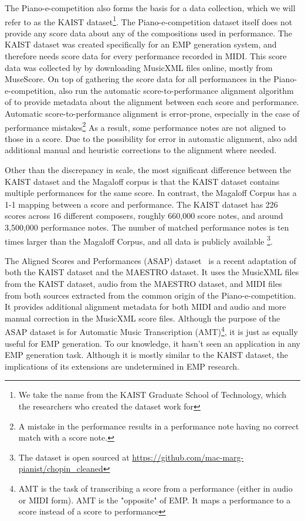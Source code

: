 The Piano-e-competition also forms the basis for a data collection, which we will refer to as the KAIST dataset\footnote{We take the name from the KAIST Graduate School of Technology, which the researchers who created the dataset work for}. The Piano-e-competition dataset itself does not provide any score data about any of the compositions used in performance. The KAIST dataset was created specifically for an EMP generation system, and therefore needs score data for every performance recorded in MIDI. This score data was collected by \citet{jeong2019virtuosonet} by downloading MusicXML files online, mostly from MuseScore. On top of gathering the score data for all performances in the Piano-e-competition, \citet{jeong2019virtuosonet} also run the automatic score-to-performance alignment algorithm of \citet{nakamura2017performance} to provide metadata about the alignment between each score and performance. Automatic score-to-performance alignment is error-prone, especially in the case of performance mistakes\footnote{A mistake in the performance results in a performance note having no correct match with a score note.} As a result, some performance notes are not aligned to those in a score. Due to the possibility for error in automatic alignment, \citet{jeong2019virtuosonet} also add additional manual and heuristic corrections to the alignment where needed. 

Other than the discrepancy in scale, the most significant difference between the KAIST dataset and the Magaloff corpus is that the KAIST dataset contains multiple performances for the same score. In contrast, the Magaloff Corpus has a 1-1 mapping between a score and performance. The KAIST dataset has 226 scores across 16 different composers, roughly 660,000 score notes, and around 3,500,000 performance notes. The number of matched performance notes is ten times larger than the Magaloff Corpus, and all data is publicly available \footnote{The dataset is open sourced at \url{https://github.com/mac-marg-pianist/chopin_cleaned}}. 

The Aligned Scores and Performances (ASAP) dataset~\cite{foscarin2020asap} is a recent adaptation of both the KAIST dataset and the MAESTRO dataset. It uses the MusicXML files from the KAIST dataset, audio from the MAESTRO dataset, and MIDI files from both sources extracted from the common origin of the Piano-e-competition. It provides additional alignment metadata for both MIDI and audio and more manual correction in the MusicXML score files. Although the purpose of the ASAP dataset is for Automatic Music Transcription (AMT)\footnote{AMT is the task of transcribing a score from a performance (either in audio or MIDI form). AMT is the "opposite" of EMP. It maps a performance to a score instead of a score to performance}, it is just as equally useful for EMP generation. To our knowledge, it hasn't seen an application in any EMP generation task. Although it is mostly similar to the KAIST dataset, the implications of its extensions are undetermined in EMP research. 


